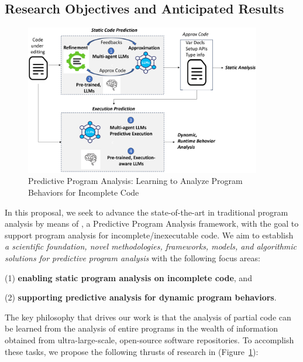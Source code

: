 \subsection{Research Objectives and Anticipated Results}

\begin{figure}[t]
    \centering
    \includegraphics[width=0.92\textwidth]{overview.png}
    \vspace{-10pt}
    \caption{Predictive Program Analysis: Learning to Analyze Program Behaviors for Incomplete Code}
    \label{fig:arch}
\end{figure}


In this proposal, we seek to advance the state-of-the-art in
traditional program analysis by means of {\tool}, a Predictive Program
Analysis framework, with the goal to support program analysis for
incomplete/inexecutable code. We aim to establish {\em a scientific
  foundation, novel methodologies, frameworks, models, and algorithmic
  solutions for predictive program analysis} with the following focus
areas:



(1) {\bf enabling static program analysis on incomplete code}, and

(2) {\bf supporting predictive analysis for dynamic program behaviors}.


The key philosophy that drives our work is that the analysis of
partial code can be learned from the analysis of entire programs in
the wealth of information obtained from ultra-large-scale, open-source
software repositories. To accomplish these tasks, we propose the
following thrusts of research in {\tool} (Figure~\ref{fig:arch}):

